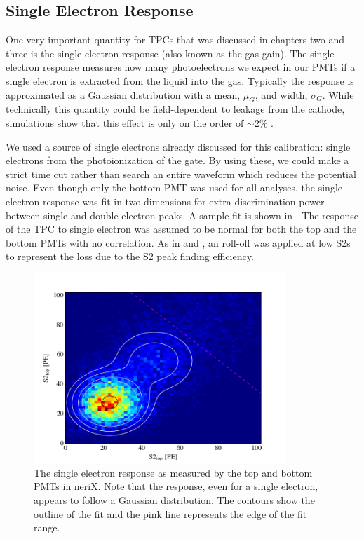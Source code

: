 \subsection{Single Electron Response}

One very important quantity for TPCs that was discussed in chapters two and three is the single electron response (also known as the gas gain).  The single electron response measures how many photoelectrons we expect in our PMTs if a single electron is extracted from the liquid into the gas.  Typically the response is approximated as a Gaussian distribution with a mean, $\mu_G$, and width, $\sigma_G$.  While technically this quantity could be field-dependent to leakage from the cathode, simulations show that this effect is only on the order of $\sim2\%$ \cite{goetzke2015low}.

We used a source of single electrons already discussed for this calibration: single electrons from the photoionization of the gate.  By using these, we could make a strict time cut rather than search an entire waveform which reduces the potential noise.  Even though only the bottom PMT was used for all analyses, the single electron response was fit in two dimensions for extra discrimination power between single and double electron peaks.  A sample fit is shown in .  The response of the TPC to single electron was assumed to be normal for both the top and the bottom PMTs with no correlation.  As in  and , an roll-off was applied at low S2s to represent the loss due to the S2 peak finding efficiency.

\begin{figure}[t]
        \centering
	\includegraphics[width=0.85\textwidth]{nerix_gas_gain}
	\caption{The single electron response as measured by the top and bottom PMTs in neriX.  Note that the response, even for a single electron, appears to follow a Gaussian distribution.  The contours show the outline of the fit and the pink line represents the edge of the fit range.}
	\label{fig:nerix_gas_gain}
\end{figure}

